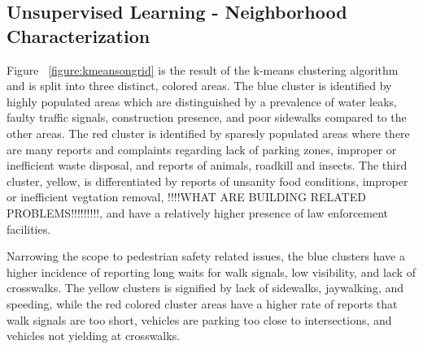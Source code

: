 \documentclass{llncs}
\begin{document}
\subsection{Unsupervised Learning - Neighborhood Characterization}

Figure ~\ref{figure:kmeansongrid} is the result of the k-means clustering algorithm and is split into three distinct, colored areas. The blue cluster is identified by highly populated areas which are distinguished by a prevalence of water leaks, faulty traffic signals, construction presence, and poor sidewalks compared to the other areas. The red cluster is identified by sparesly populated areas where there are many reports and complaints regarding lack of parking zones, improper or inefficient waste disposal, and reports of animals, roadkill and insects. The third cluster, yellow, is differentiated by reports of unsanity food conditions, improper or inefficient vegtation removal, !!!!WHAT ARE BUILDING RELATED PROBLEMS!!!!!!!!!, and have a relatively higher presence of law enforcement facilities.

Narrowing the scope to pedestrian safety related issues, the blue clusters have a higher incidence of reporting long waits for walk signals, low visibility, and lack of crosswalks. The yellow clusters is signified by lack of sidewalks, jaywalking, and speeding, while the red colored cluster areas have a higher rate of reports that walk signals are too short, vehicles are parking too close to intersections, and vehicles not yielding at crosswalks. 
\end{document}
